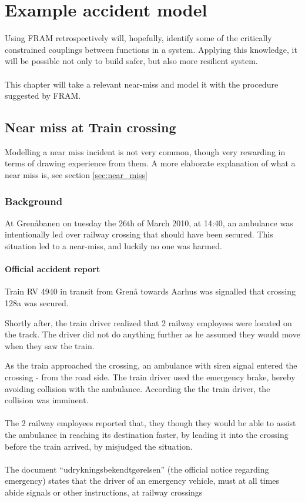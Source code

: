 \chapter{Example accident model}
\label{ch:accident_model}
Using FRAM retrospectively will, hopefully, identify some of the critically constrained couplings between functions in a system. Applying this knowledge, it will be possible not only to build safer, but also more resilient system.\\
\\
This chapter will take a relevant near-miss and model it with the procedure suggested by FRAM. 

\section{Near miss at Train crossing}
Modelling a near miss incident is not very common, though very rewarding in terms of drawing experience from them. A more elaborate explanation of what a near miss is, see section \ref{sec:near_miss}


\subsection{Background}
At Grenåbanen on tuesday the 26th of March 2010, at 14:40, an ambulance was intentionally led over railway crossing that should have been secured. This situation led to a near-miss, and luckily no one was harmed.

\subsubsection{Official accident report}
Train RV 4940 in transit from Grenå towards Aarhus was signalled that crossing 128a was secured.

Shortly after, the train driver realized that 2 railway employees were located on the track. The driver did not do anything further as he assumed they would move when they saw the train.

As the train approached the crossing, an ambulance with siren signal entered the crossing - from the road side. The train driver used the emergency brake, hereby avoiding collision with the ambulance. According the the train driver, the collision was imminent.\\
\\
The 2 railway employees reported that, they though they would be able to assist the ambulance in reaching its destination faster, by leading it into the crossing before the train arrived, by misjudged the situation.\\
\\
The document ``udrykningsbekendtgørelsen'' (the official notice regarding emergency) states that the driver of an emergency vehicle, must at all times abide signals or other instructions, at railway crossings

